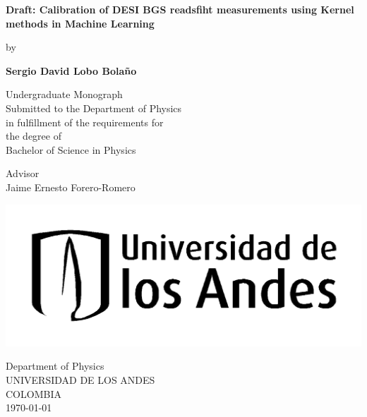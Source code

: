 \begin{titlepage}
    \begin{center}
        \vspace*{0.8 cm}
        
        \Large
        \textbf{Draft: Calibration of DESI BGS readsfiht measurements using Kernel methods in Machine Learning}
        
       by\\
        \large
        
        
        \vspace{1.0cm}
        
        \textbf{Sergio David Lobo Bolaño}
        
        \vspace{1.1 cm}
        \large
        Undergraduate Monograph \\
                \vspace{1cm}
        \normalsize 
        Submitted to the Department of Physics\\
         in fulfillment of the requirements for\\
       the degree of\\
       \vspace{0.4 cm}
       \LARGE
       Bachelor of Science in Physics\\
      
        \vspace{1cm}
        
        \normalsize
        Advisor\\
        \Large
        Jaime Ernesto Forero-Romero
        
        

\begin{center}
\includegraphics[width=0.4\linewidth]{TeX_files/universidaddelosandes}
\end{center}

                \vspace{2cm}
        \normalsize
        Department of Physics	\\
        UNIVERSIDAD DE LOS ANDES\\
        COLOMBIA\\
        \today
        
    \end{center}
\end{titlepage}